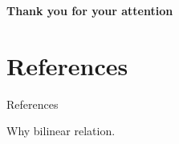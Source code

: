 \documentclass{beamer}
\begin{document}
\begin{frame}
  \centering \Large
  \textbf{{Thank you for your attention}}
\end{frame}

\section*{References}
\begin{frame}[allowframebreaks]{References}
\printbibliography
\end{frame}

\begin{frame}
  Why bilinear relation.

\end{frame}
\end{document}
